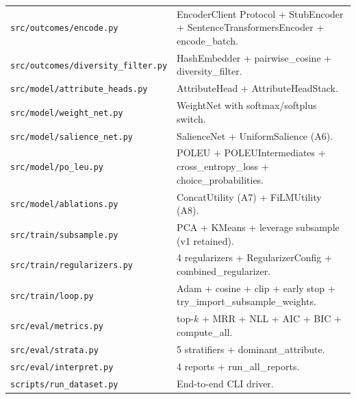 \documentclass[11pt,a4paper]{article}
\begin{document}
\begin{center}
\begin{longtable}{@{}l p{}@{}}
\texttt{src/outcomes/encode.py}            & EncoderClient Protocol + StubEncoder + SentenceTransformersEncoder + encode\_batch. \\
\texttt{src/outcomes/diversity\_filter.py} & HashEmbedder + pairwise\_cosine + diversity\_filter. \\
\texttt{src/model/attribute\_heads.py}     & AttributeHead + AttributeHeadStack. \\
\texttt{src/model/weight\_net.py}          & WeightNet with softmax/softplus switch. \\
\texttt{src/model/salience\_net.py}        & SalienceNet + UniformSalience (A6). \\
\texttt{src/model/po\_leu.py}              & POLEU + POLEUIntermediates + cross\_entropy\_loss + choice\_probabilities. \\
\texttt{src/model/ablations.py}            & ConcatUtility (A7) + FiLMUtility (A8). \\
\texttt{src/train/subsample.py}            & PCA + KMeans + leverage subsample (v1 retained). \\
\texttt{src/train/regularizers.py}         & 4 regularizers + RegularizerConfig + combined\_regularizer. \\
\texttt{src/train/loop.py}                 & Adam + cosine + clip + early stop + try\_import\_subsample\_weights. \\
\texttt{src/eval/metrics.py}               & top-$k$ + MRR + NLL + AIC + BIC + compute\_all. \\
\texttt{src/eval/strata.py}                & 5 stratifiers + dominant\_attribute. \\
\texttt{src/eval/interpret.py}             & 4 reports + run\_all\_reports. \\
\texttt{scripts/run\_dataset.py}           & End-to-end CLI driver. \\
\end{longtable}
\end{center}
\end{document}
